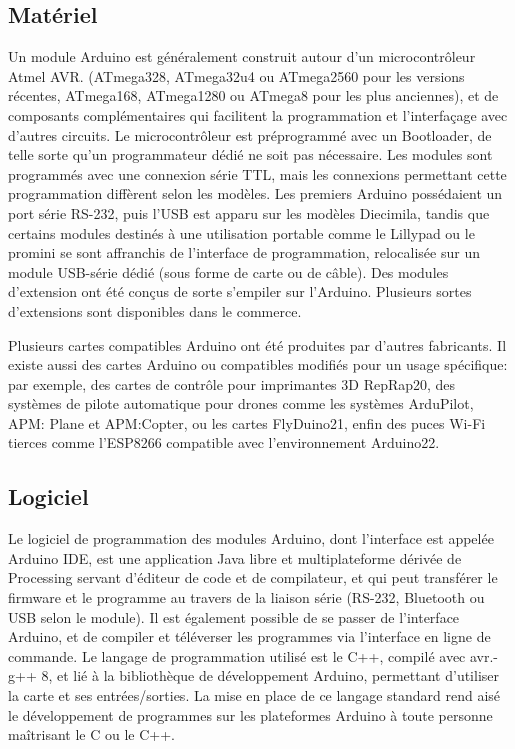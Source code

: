 \subsection{Matériel}
Un module Arduino est généralement construit autour d’un microcontrôleur Atmel 
AVR. (ATmega328, ATmega32u4 ou ATmega2560 pour les versions récentes, ATmega168, 
ATmega1280 ou ATmega8 pour les plus anciennes), et de composants complémentaires 
qui facilitent la programmation et l’interfaçage avec d’autres circuits. 
Le microcontrôleur est préprogrammé avec un Bootloader, de telle sorte qu’un 
programmateur dédié ne soit pas nécessaire. Les modules sont programmés avec 
une connexion série TTL, mais les connexions permettant cette programmation 
diffèrent selon les modèles. Les premiers Arduino possédaient un port série 
RS-232, puis l’USB est apparu sur les modèles Diecimila, tandis que certains 
modules destinés à une utilisation portable comme le Lillypad ou le promini se 
sont affranchis de l’interface de programmation, relocalisée sur un module 
USB-série dédié (sous forme de carte ou de câble). Des modules d’extension 
ont été conçus de sorte s’empiler sur l’Arduino. Plusieurs sortes d’extensions
sont disponibles dans le commerce.

Plusieurs cartes compatibles Arduino ont été produites par d’autres fabricants. 
Il existe aussi des cartes Arduino ou compatibles modifiés pour un usage 
spécifique: par exemple, des cartes de contrôle pour imprimantes 3D RepRap20, 
des systèmes de pilote automatique pour drones comme les systèmes ArduPilot, 
APM: Plane et APM:Copter, ou les cartes FlyDuino21, enfin des puces Wi-Fi 
tierces comme l’ESP8266 compatible avec l’environnement Arduino22.\cite{30}

\subsection{Logiciel}
Le logiciel de programmation des modules Arduino, dont l’interface est appelée 
Arduino IDE, est une application Java libre et multiplateforme dérivée de 
Processing servant d’éditeur de code et de compilateur, et qui peut transférer 
le firmware et le programme au travers de la liaison série (RS-232, Bluetooth 
ou USB selon le module). Il est également possible de se passer de l’interface 
Arduino, et de compiler et téléverser les programmes via l’interface en ligne 
de commande. Le langage de programmation utilisé est le C++, compilé avec 
avr.-g++ 8, et lié à la bibliothèque de développement Arduino, permettant 
d’utiliser la carte et ses entrées/sorties. La mise en place de ce langage 
standard rend aisé le développement de programmes sur les plateformes Arduino à 
toute personne maîtrisant le C ou le C++.\cite{31}


